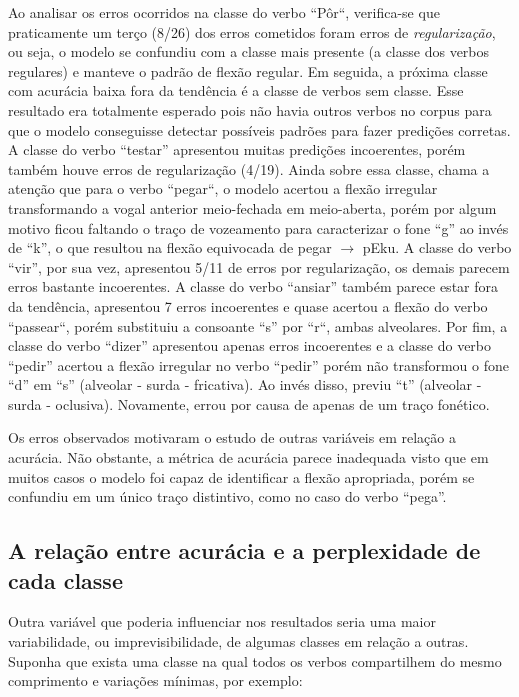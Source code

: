 Ao analisar os erros ocorridos na classe do verbo “Pôr“, verifica-se que praticamente um terço (8/26) dos erros cometidos foram erros de \textit{regularização}, ou seja, o modelo se confundiu com a classe mais presente (a classe dos verbos regulares) e manteve o padrão de flexão regular. Em seguida, a próxima classe com acurácia baixa fora da tendência é a classe de verbos sem classe. Esse resultado era totalmente esperado pois não havia outros verbos no corpus para que o modelo conseguisse detectar possíveis padrões para fazer predições corretas. A classe do verbo “testar” apresentou muitas predições incoerentes, porém também houve erros de regularização (4/19). Ainda sobre essa classe, chama a atenção que para o verbo “pegar“, o modelo acertou a flexão irregular transformando a vogal anterior meio-fechada em meio-aberta, porém por algum motivo ficou faltando o traço de vozeamento para caracterizar o fone “g” ao invés de “k”, o que resultou na flexão equivocada de pegar $\rightarrow$ pEku. A classe do verbo “vir”, por sua vez, apresentou 5/11 de erros por regularização, os demais parecem erros bastante incoerentes. A classe do verbo “ansiar” também parece estar fora da tendência, apresentou 7 erros incoerentes e quase acertou a flexão do verbo “passear“, porém substituiu a consoante “s” por “r“, ambas alveolares. Por fim, a classe do verbo “dizer” apresentou apenas erros incoerentes e a classe do verbo “pedir” acertou a flexão irregular no verbo “pedir” porém não transformou o fone “d” em “s” (alveolar - surda - fricativa). Ao invés disso, previu “t” (alveolar - surda - oclusiva). Novamente, errou por causa de apenas de um traço fonético.

Os erros observados motivaram o estudo de outras variáveis em relação a acurácia. Não obstante, a métrica de acurácia parece inadequada visto que em muitos casos o modelo foi capaz de identificar a flexão apropriada, porém se confundiu em um único traço distintivo, como no caso do verbo “pega”.



\subsection{A relação entre acurácia e a perplexidade de cada classe}

Outra variável que poderia influenciar nos resultados seria uma maior variabilidade, ou imprevisibilidade, de algumas classes em relação a outras. Suponha que exista uma classe na qual todos os verbos compartilhem do mesmo comprimento e variações mínimas, por exemplo:

